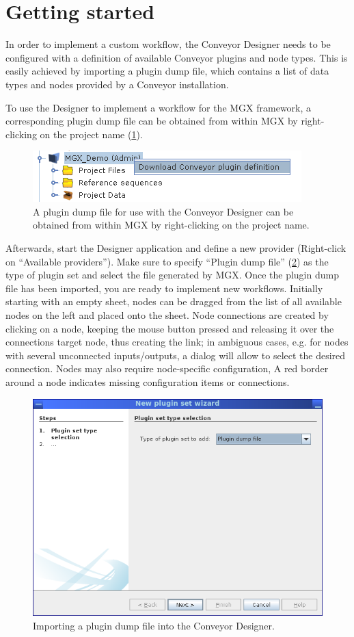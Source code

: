 \section{Getting started}

In order to implement a custom workflow, the Conveyor Designer needs to be configured
with a definition of available Conveyor plugins and node types. This is easily 
achieved by importing a plugin dump file, which contains a list of data types and
nodes provided by a Conveyor installation.

To use the Designer to implement a workflow for the MGX framework, a corresponding
plugin dump file can be obtained from within MGX by right-clicking on the 
project name (\ref{getdump}).

\begin{figure}[H]
\centering
\includegraphics[width=.5\textwidth]{img/conveyor/getdump}
\caption[Plugin dump.]{A plugin dump file for use with the Conveyor Designer can be obtained from within MGX
by right-clicking on the project name.}
\label{getdump}
\end{figure}

Afterwards, start the Designer application and define a new provider (Right-click on ``Available providers''). 
Make sure to specify ``Plugin dump file'' (\ref{loaddump}) as the type of plugin set and select the file
generated by MGX. Once the plugin
dump file has been imported, you are ready to implement new workflows. Initially starting with an empty sheet,
nodes can be dragged from the list of all available nodes on the left and placed onto the sheet. Node connections
are created by clicking on a node, keeping the mouse button pressed and releasing it over the connections target
node, thus creating the link; in ambiguous cases, e.g. for nodes with several unconnected
inputs/outputs, a dialog will allow to select the desired connection.
Nodes may also require node-specific configuration, 
A red border around a node indicates missing configuration items or connections.

\begin{figure}[H]
\centering
\includegraphics[width=.7\textwidth]{img/conveyor/loaddump}
\caption[Adding a new provider.]{Importing a plugin dump file into the Conveyor Designer.}
\label{loaddump}
\end{figure}

